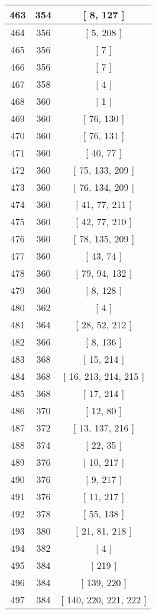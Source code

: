 \begin{center}
\begin{longtable}[H]{|| c c c ||}
\hline
463 & 354 & [ 8, 127 ] \\ 
\hline
464 & 356 & [ 5, 208 ] \\ 
\hline
465 & 356 & [ 7 ] \\ 
\hline
466 & 356 & [ 7 ] \\ 
\hline
467 & 358 & [ 4 ] \\ 
\hline
468 & 360 & [ 1 ] \\ 
\hline
469 & 360 & [ 76, 130 ] \\ 
\hline
470 & 360 & [ 76, 131 ] \\ 
\hline
471 & 360 & [ 40, 77 ] \\ 
\hline
472 & 360 & [ 75, 133, 209 ] \\ 
\hline
473 & 360 & [ 76, 134, 209 ] \\ 
\hline
474 & 360 & [ 41, 77, 211 ] \\ 
\hline
475 & 360 & [ 42, 77, 210 ] \\ 
\hline
476 & 360 & [ 78, 135, 209 ] \\ 
\hline
477 & 360 & [ 43, 74 ] \\ 
\hline
478 & 360 & [ 79, 94, 132 ] \\ 
\hline
479 & 360 & [ 8, 128 ] \\ 
\hline
480 & 362 & [ 4 ] \\ 
\hline
481 & 364 & [ 28, 52, 212 ] \\ 
\hline
482 & 366 & [ 8, 136 ] \\ 
\hline
483 & 368 & [ 15, 214 ] \\ 
\hline
484 & 368 & [ 16, 213, 214, 215 ] \\ 
\hline
485 & 368 & [ 17, 214 ] \\ 
\hline
486 & 370 & [ 12, 80 ] \\ 
\hline
487 & 372 & [ 13, 137, 216 ] \\ 
\hline
488 & 374 & [ 22, 35 ] \\ 
\hline
489 & 376 & [ 10, 217 ] \\ 
\hline
490 & 376 & [ 9, 217 ] \\ 
\hline
491 & 376 & [ 11, 217 ] \\ 
\hline
492 & 378 & [ 55, 138 ] \\ 
\hline
493 & 380 & [ 21, 81, 218 ] \\ 
\hline
494 & 382 & [ 4 ] \\ 
\hline
495 & 384 & [ 219 ] \\ 
\hline
496 & 384 & [ 139, 220 ] \\ 
\hline
497 & 384 & [ 140, 220, 221, 222 ] \\ 

\end{longtable}
\end{center}
